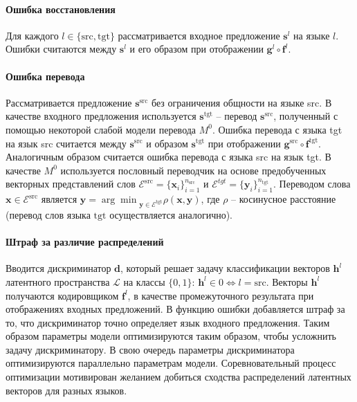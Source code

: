 \documentclass[12pt,twoside]{article}
\begin{document}
   \paragraph{Ошибка восстановления} Для каждого $l \in \{\text{src}, \text{tgt}\}$ рассматривается входное предложение $\mathbf{s}^{l}$ на языке $l$. Ошибки считаются между $\mathbf{s}^{l}$ и его образом при отображении $\textbf{g}^{l} \circ \textbf{f}^{l}$.
   
   \paragraph{Ошибка перевода} Рассматривается предложение $\mathbf{s}^{\text{src}}$ без ограничения общности на языке src. В качестве входного предложения используется $\mathbf{s}^{\text{tgt}}$ -- перевод $\mathbf{s}^{\text{src}}$, полученный с помощью некоторой слабой модели перевода $M^0$. Ошибка перевода с языка tgt на язык src считается между $\mathbf{s}^{\text{src}}$ и образом $\mathbf{s}^{\text{tgt}}$ при отображении $\textbf{g}^{\text{src}} \circ \textbf{f}^{\text{tgt}}$. Аналогичным образом считается ошибка перевода с языка src на язык tgt. В качестве $M^0$ используется пословный переводчик на основе предобученных векторных представлений слов $\mathcal{E}^{\text{src}} = \{\textbf{x}_i\}_{i=1}^{n_{\text{src}}}$ и $\mathcal{E}^{tgt} = \{\textbf{y}_i\}_{i=1}^{n_{\text{tgt}}}$. Переводом слова $\textbf{x} \in \mathcal{E}^{\text{src}}$ является $\textbf{y} = {\arg\min}_{\textbf{y} \in  \mathcal{E}^{\text{tgt}}} \rho(\textbf{x}, \textbf{y})$, где $\rho$ -- косинусное расстояние (перевод слов языка $\text{tgt}$ осуществляется аналогично).
   
   \paragraph{Штраф за различие распределений} Вводится дискриминатор $\textbf{d}$, который решает задачу классификации векторов $\textbf{h}^l$ латентного пространства $\mathcal{L}$ на классы $\{0, 1\}$: $\textbf{h}^l \in 0 \Leftrightarrow l = \text{src}$. Векторы $\textbf{h}^l$ получаются кодировщиком $\textbf{f}^{l}$, в качестве промежуточного результата при отображениях входных предложений. В функцию ошибки добавляется штраф за то, что дискриминатор точно определяет язык входного предложения. Таким образом параметры модели оптимизируются таким образом, чтобы усложнить задачу дискриминатору. В свою очередь параметры дискриминатора оптимизируются параллельно параметрам модели. Соревновательный процесс оптимизации мотивирован желанием добиться сходства распределений латентных векторов для разных языков.
   
\end{document}
